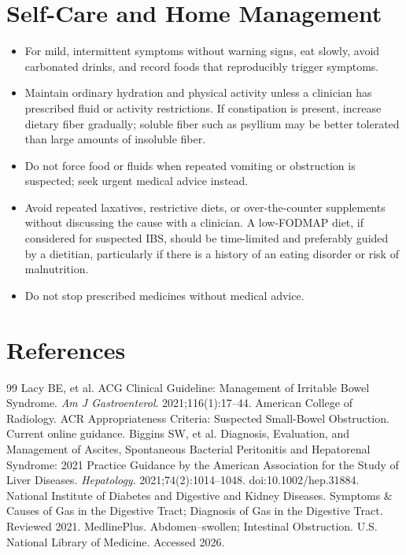 \section*{Self-Care and Home Management}
\begin{itemize}
  \item For mild, intermittent symptoms without warning signs, eat slowly, avoid carbonated drinks, and record foods that reproducibly trigger symptoms.
  \item Maintain ordinary hydration and physical activity unless a clinician has prescribed fluid or activity restrictions. If constipation is present, increase dietary fiber gradually; soluble fiber such as psyllium may be better tolerated than large amounts of insoluble fiber.
  \item Do not force food or fluids when repeated vomiting or obstruction is suspected; seek urgent medical advice instead.
  \item Avoid repeated laxatives, restrictive diets, or over-the-counter supplements without discussing the cause with a clinician. A low-FODMAP diet, if considered for suspected IBS, should be time-limited and preferably guided by a dietitian, particularly if there is a history of an eating disorder or risk of malnutrition.
  \item Do not stop prescribed medicines without medical advice.
\end{itemize}

\section*{References}
\begin{thebibliography}{99}
 Lacy BE, et al. ACG Clinical Guideline: Management of Irritable Bowel Syndrome. \textit{Am J Gastroenterol}. 2021;116(1):17--44.
 American College of Radiology. ACR Appropriateness Criteria: Suspected Small-Bowel Obstruction. Current online guidance.
 Biggins SW, et al. Diagnosis, Evaluation, and Management of Ascites, Spontaneous Bacterial Peritonitis and Hepatorenal Syndrome: 2021 Practice Guidance by the American Association for the Study of Liver Diseases. \textit{Hepatology}. 2021;74(2):1014--1048. doi:10.1002/hep.31884.
 National Institute of Diabetes and Digestive and Kidney Diseases. Symptoms \& Causes of Gas in the Digestive Tract; Diagnosis of Gas in the Digestive Tract. Reviewed 2021.
 MedlinePlus. Abdomen--swollen; Intestinal Obstruction. U.S. National Library of Medicine. Accessed 2026.
\end{thebibliography}
